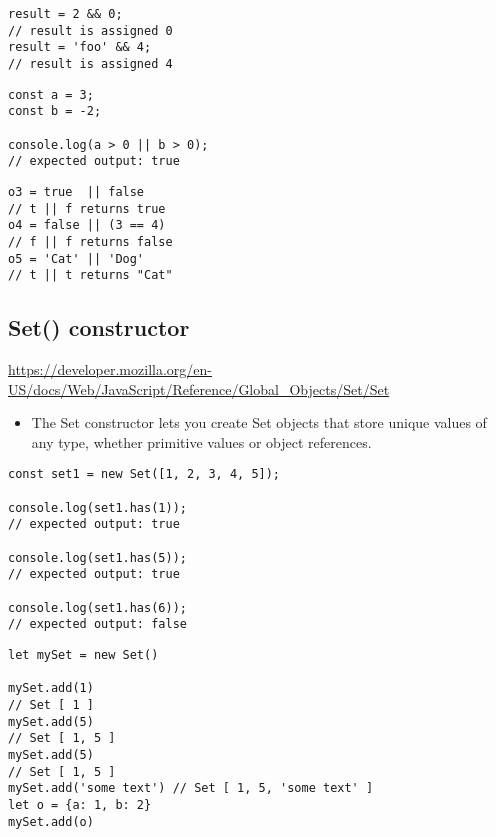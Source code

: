 \documentclass[10pt]{article}
\begin{document}
\begin{lstlisting}[title=Example Logical AND \&\&, captionpos=t]
result = 2 && 0;      
// result is assigned 0
result = 'foo' && 4;  
// result is assigned 4
\end{lstlisting}

\begin{lstlisting}[title=Example Logical OR $\Vert$, captionpos=t]
const a = 3;
const b = -2;

console.log(a > 0 || b > 0);
// expected output: true
\end{lstlisting}

\begin{lstlisting}[title=Example Logical OR $\Vert$, captionpos=t]
o3 = true  || false      
// t || f returns true
o4 = false || (3 == 4)   
// f || f returns false
o5 = 'Cat' || 'Dog'     
// t || t returns "Cat"
\end{lstlisting}

\medskip %





\medskip %
\pagebreak
\subsection{Set() constructor}

\url{https://developer.mozilla.org/en-US/docs/Web/JavaScript/Reference/Global_Objects/Set/Set}

\begin{itemize}
	\item The Set constructor lets you create Set objects that store unique values of any type, whether primitive values or object references.
\end{itemize}

\begin{lstlisting}[title=Example set1 = new Set(), captionpos=t]
const set1 = new Set([1, 2, 3, 4, 5]);

console.log(set1.has(1));
// expected output: true

console.log(set1.has(5));
// expected output: true

console.log(set1.has(6));
// expected output: false
\end{lstlisting}

\begin{lstlisting}[title=Example using Set() object, captionpos=t]
let mySet = new Set()

mySet.add(1)           
// Set [ 1 ]
mySet.add(5)          
// Set [ 1, 5 ]
mySet.add(5)           
// Set [ 1, 5 ]
mySet.add('some text') // Set [ 1, 5, 'some text' ]
let o = {a: 1, b: 2}
mySet.add(o)
\end{lstlisting}
\end{document}
